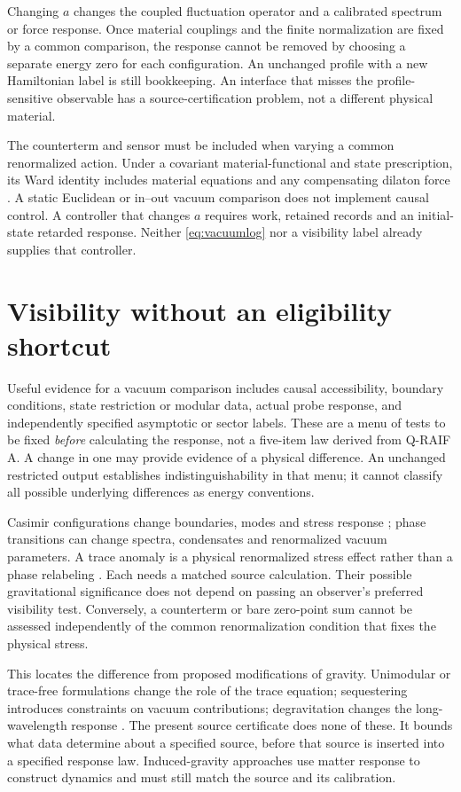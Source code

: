 \documentclass[12pt,a4paper]{article}
\theoremstyle{definition}
\begin{document}
Changing $a$ changes the coupled fluctuation operator and a calibrated
spectrum or force response. Once material couplings and the finite
normalization are fixed by a common comparison, the response cannot be
removed by choosing a separate energy zero for each configuration.
An unchanged profile with a new Hamiltonian label is still bookkeeping.
An interface that misses the profile-sensitive observable has a
source-certification problem, not a different physical material.

The counterterm and sensor must be included when varying a common
renormalized action. Under a covariant material-functional and state
prescription, its Ward identity includes material equations and any
compensating dilaton force \cite{Liu2026HAFFD}. A static Euclidean or
in--out vacuum comparison does not implement causal control. A controller
that changes $a$ requires work, retained records and an initial-state
retarded response. Neither \eqref{eq:vacuumlog} nor a visibility label
already supplies that controller.

\section{Visibility without an eligibility shortcut}
\label{sec:visibility}

Useful evidence for a vacuum comparison includes causal accessibility,
boundary conditions, state restriction or modular data, actual probe
response, and independently specified asymptotic or sector labels. These
are a menu of tests to be fixed \emph{before} calculating the response,
not a five-item law derived from Q-RAIF A. A change in one may provide
evidence of a physical difference. An unchanged restricted output
establishes indistinguishability in that menu; it cannot classify all
possible underlying differences as energy conventions.

Casimir configurations change boundaries, modes and stress response
\cite{Casimir1948}; phase transitions can change spectra, condensates and
renormalized vacuum parameters. A trace anomaly is a physical
renormalized stress effect rather than a phase relabeling
\cite{Wald1978}. Each needs a matched source calculation. Their possible
gravitational significance does not depend on passing an observer's
preferred visibility test. Conversely, a counterterm or bare zero-point
sum cannot be assessed independently of the common renormalization
condition that fixes the physical stress.

This locates the difference from proposed modifications of gravity.
Unimodular or trace-free formulations change the role of the trace
equation; sequestering introduces constraints on vacuum contributions;
degravitation changes the long-wavelength response
\cite{Ellis2011,KaloperPadilla2014,ArkaniHamed2002}. The present source
certificate does none of these. It bounds what data determine about a
specified source, before that source is inserted into a specified
response law. Induced-gravity approaches use matter response to construct
dynamics and must still match the source and its calibration.
\end{document}
